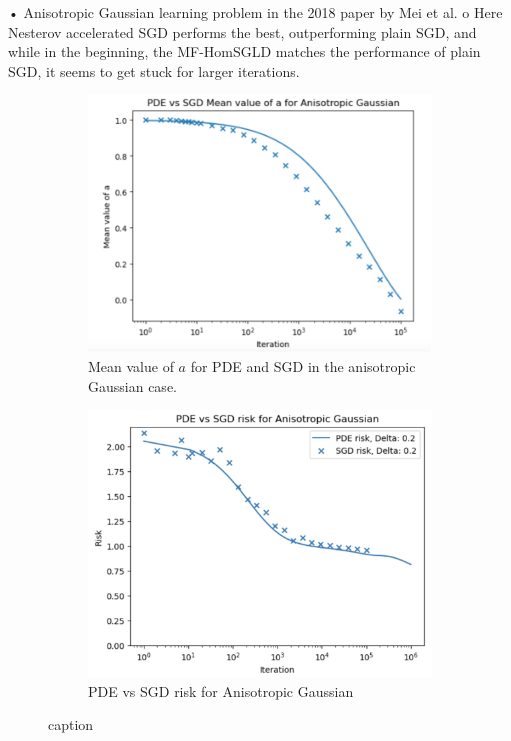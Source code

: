 \documentclass{article}
\begin{document}
 
•	Anisotropic Gaussian learning problem in the 2018 paper by Mei et al.
o	Here Nesterov accelerated SGD performs the best, outperforming plain SGD, and while in the beginning, the MF-HomSGLD matches the performance of plain SGD, it seems to get stuck for larger iterations. 


     \begin{figure}[H]
 \begin{subfigure}{0.5\textwidth}
   \centering
   \includegraphics[width=0.8\linewidth]{images/NGuyen2018-pde-sgd-gauss-anisotropic.png}
   \caption{Mean value of $ a$ for PDE and SGD in the anisotropic Gaussian case.}
   \label{fig: val a anisotropic}
 \end{subfigure}%
 \begin{subfigure}{0.5\textwidth}
   \centering
   \includegraphics[width=0.8\linewidth]{images/NGuyen2018-pde-sgd-risk-gauss-anisotropic.png}
   \caption{PDE vs SGD risk for Anisotropic Gaussian}
   \label{fig: risk anisotropic}
 \end{subfigure}
 \caption{ caption}
 \label{fig: anisotropic gaussian case plots}
 \end{figure} 
\end{document}
